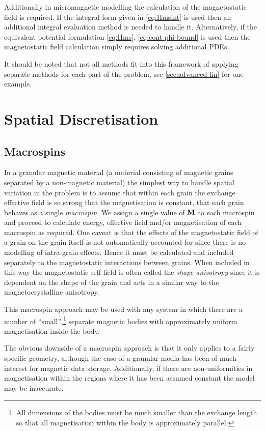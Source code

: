 Additionally in micromagnetic modelling the calculation of the magnetostatic field is required.
If the integral form given in \cref{eq:Hmsint} is used then an additional integral evaluation method is needed to handle it.
Alternatively, if the equivalent potential formulation \cref{eq:Hms}, \cref{eq:cont-phi-bound} is used then the magnetostatic field calculation simply requires solving additional PDEs.

It should be noted that not all methods fit into this framework of applying separate methods for each part of the problem, see \cref{sec:advanced-lin} for one example.


\section{Spatial Discretisation}
\label{sec:spat-discr}

\subsection{Macrospins}
\label{sec:sd-macrospins}

In a granular magnetic material (a material consisting of magnetic grains separated by a non-magnetic material) the simplest way to handle spatial variation in the problem is to assume that within each grain the exchange effective field is so strong that the magnetisation is constant, \ie that each grain behaves as a single \emph{macrospin}.
We assign a single value of $\mathbf{M}$ to each macrospin and proceed to calculate energy, effective field and/or magnetisation of each macrospin as required.
One caveat is that the effects of the magnetostatic field of a grain on the grain itself is not automatically accounted for since there is no modelling of intra-grain effects.
Hence it must be calculated and included separately to the magnetostatic interactions between grains.
When included in this way the magnetostatic self field is often called the \emph{shape anisotropy} since it is dependent on the shape of the grain and acts in a similar way to the magnetocrystalline anisotropy. 

This macrospin approach may be used with any system in which there are a number of ``small'',\footnote{All dimensions of the bodies must be much smaller than the exchange length so that all magnetisation within the body is approximately parallel.} separate magnetic bodies with approximately uniform magnetisation inside the body.

The obvious downside of a macrospin approach is that it only applies to a fairly specific geometry, although the case of a granular media has been of much interest for magnetic data storage. 
Additionally, if there are non-uniformities in magnetisation within the regions where it has been assumed constant the model may be inaccurate.


